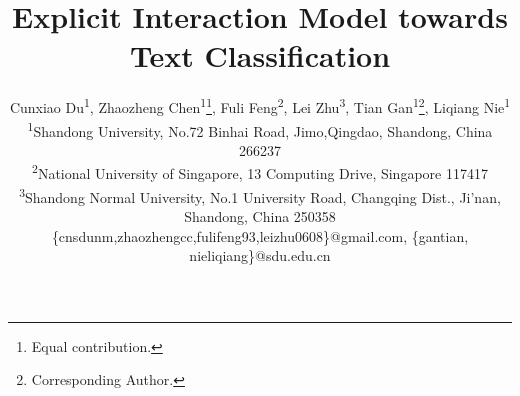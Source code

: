 \documentclass[letterpaper]{article} %
\begin{document}
%
\title{Explicit Interaction Model towards Text Classification}
\author{
Cunxiao Du\textsuperscript{1},
Zhaozheng Chen\textsuperscript{1}\thanks{Equal contribution.},
Fuli Feng\textsuperscript{2}\footnotemark[1],
Lei Zhu\textsuperscript{3},
Tian Gan\textsuperscript{1}\thanks{Corresponding Author.}, 
Liqiang Nie\textsuperscript{1}\\
\textsuperscript{1}Shandong University, No.72 Binhai Road, Jimo,Qingdao, Shandong, China 266237\\
\textsuperscript{2}National University of Singapore, 13 Computing Drive, Singapore 117417\\
\textsuperscript{3}Shandong Normal University,
No.1 University Road, Changqing Dist.,
Ji'nan, Shandong, China 250358
\\
\{cnsdunm,zhaozhengcc,fulifeng93,leizhu0608\}@gmail.com,
\{gantian, nieliqiang\}@sdu.edu.cn
}


\maketitle
\end{document}
